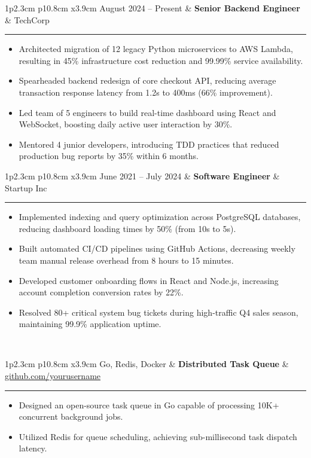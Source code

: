 \documentclass[10pt,a4paper]{article}
\newcommand{\mystrut}{\rule[-.3\baselineskip]{0pt}{\baselineskip}}
\newcommand{\larrow}{$\blacktriangleright$\ }
\newcommand{\cvsection}[1]{
    \vspace{8pt}
    \colorbox{sectcol}{\mystrut \makebox[1\linewidth][l]{
        \textcolor{white}{\ \larrow \textbf{#1}}
    }}\\
    \vspace{-4pt}
}
\newcommand{\cvevent}[3]{
    \vspace{6pt}
    \begin{tabular*}{1\textwidth}{p{2.3cm} p{10.8cm} x{3.9cm}}
        \textcolor{bgcol}{#1} & \textbf{#2} & \vspace{2.5pt}\textcolor{sectcol}{#3}
    \end{tabular*}
    \vspace{-12pt}
    \textcolor{softcol}{\hrule}
    \vspace{4pt}
}
\begin{document}
\cvevent{August 2024 -- Present}{Senior Backend Engineer}{TechCorp}
\begin{itemize}
    \item Architected migration of 12 legacy Python microservices to AWS Lambda, resulting in 45\% infrastructure cost reduction and 99.99\% service availability.
    \item Spearheaded backend redesign of core checkout API, reducing average transaction response latency from 1.2s to 400ms (66\% improvement).
    \item Led team of 5 engineers to build real-time dashboard using React and WebSocket, boosting daily active user interaction by 30\%.
    \item Mentored 4 junior developers, introducing TDD practices that reduced production bug reports by 35\% within 6 months.
\end{itemize}
\vspace{6pt}

\cvevent{June 2021 -- July 2024}{Software Engineer}{Startup Inc}
\begin{itemize}
    \item Implemented indexing and query optimization across PostgreSQL databases, reducing dashboard loading times by 50\% (from 10s to 5s).
    \item Built automated CI/CD pipelines using GitHub Actions, decreasing weekly team manual release overhead from 8 hours to 15 minutes.
    \item Developed customer onboarding flows in React and Node.js, increasing account completion conversion rates by 22\%.
    \item Resolved 80+ critical system bug tickets during high-traffic Q4 sales season, maintaining 99.9\% application uptime.
\end{itemize}
\vspace{4pt}

\cvsection{Key Projects}

\cvevent{Go, Redis, Docker}{Distributed Task Queue}{\href{https://github.com/yourusername}{github.com/yourusername}}
\begin{itemize}
    \item Designed an open-source task queue in Go capable of processing 10K+ concurrent background jobs.
    \item Utilized Redis for queue scheduling, achieving sub-millisecond task dispatch latency.
\end{itemize}
\vspace{6pt}
\end{document}
